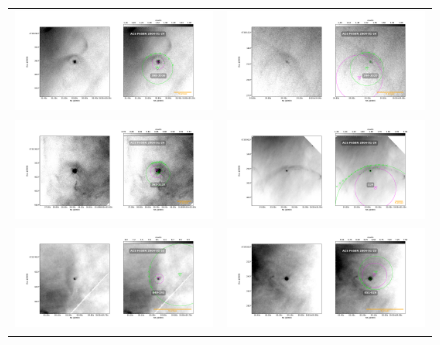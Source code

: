 \documentclass{article}
\begin{document}
\begin{figure}[htp]
\centering
\begin{tabular}{l l}
    \includegraphics[width=0.5\linewidth]{j8oc08010_wcs/308-3036-Bally_08-images.pdf}
    &\includegraphics[width=0.5\linewidth]{j8oc08010_wcs/344-3020-Bally_08-images.pdf}\\
    \includegraphics[width=0.5\linewidth]{j8oc08010_wcs/362-3137-Bally_08-images.pdf}
    &\includegraphics[width=0.5\linewidth]{j8oc08010_wcs/LL6-Bally_08-images.pdf}\\
    \includegraphics[width=0.5\linewidth]{j8oc09010_wcs/049-143-Bally_09-images.pdf}
    &\includegraphics[width=0.5\linewidth]{j8oc09010_wcs/051-024-Bally_09-images.pdf}\\
   
 \end{tabular}
\end{figure}
\end{document}
